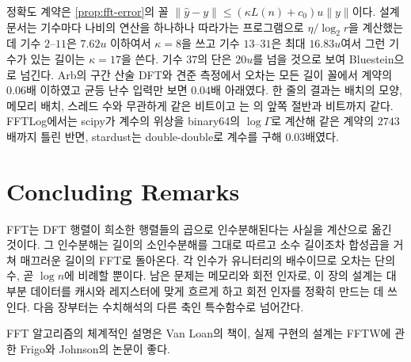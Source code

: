 \begin{instardust}
정확도 계약은 \cref{prop:fft-error}의 꼴 $\|\hat y-y\|\le(\kappa L(n)+c_0)u\|y\|$이다. 설계 문서는 기수마다 나비의 연산을 하나하나 따라가는 프로그램으로 $\eta/\log_2r$을 계산했는데 기수 $2$--$11$은 $7.62u$ 이하여서 $\kappa=8$을 쓰고 기수 $13$--$31$은 최대 $16.83u$여서 그런 기수가 있는 길이는 $\kappa=17$을 쓴다. 기수 $37$의 단은 $20u$를 넘을 것으로 보여 Bluestein으로 넘긴다. Arb의 구간 산술 DFT와 견준 측정에서 오차는 모든 길이 꼴에서 계약의 $0.06$배 이하였고 균등 난수 입력만 보면 $0.04$배 아래였다. 한 줄의 결과는 배치의 모양, 메모리 배치, 스레드 수와 무관하게 같은 비트이고 는 의 앞쪽 절반과 비트까지 같다. FFTLog에서는 scipy가 계수의 위상을 binary64의 $\log\Gamma$로 계산해 같은 계약의 $2743$배까지 틀린 반면, stardust는 double-double로 계수를 구해 $0.03$배였다.
\end{instardust}

\section{Concluding Remarks}

FFT는 DFT 행렬이 희소한 행렬들의 곱으로 인수분해된다는 사실을 계산으로 옮긴 것이다. 그 인수분해는 길이의 소인수분해를 그대로 따르고 소수 길이조차 합성곱을 거쳐 매끄러운 길이의 FFT로 돌아온다. 각 인수가 유니터리의 배수이므로 오차는 단의 수, 곧 $\log n$에 비례할 뿐이다. 남은 문제는 메모리와 회전 인자로, 이 장의 설계는 대부분 데이터를 캐시와 레지스터에 맞게 흐르게 하고 회전 인자를 정확히 만드는 데 쓰인다. 다음 장부터는 수치해석의 다른 축인 특수함수로 넘어간다.

FFT 알고리즘의 체계적인 설명은 Van Loan의 책\cite{vanloan1992}이, 실제 구현의 설계는 FFTW에 관한 Frigo와 Johnson의 논문\cite{frigo2005fftw}이 좋다.

\chapterreferences
